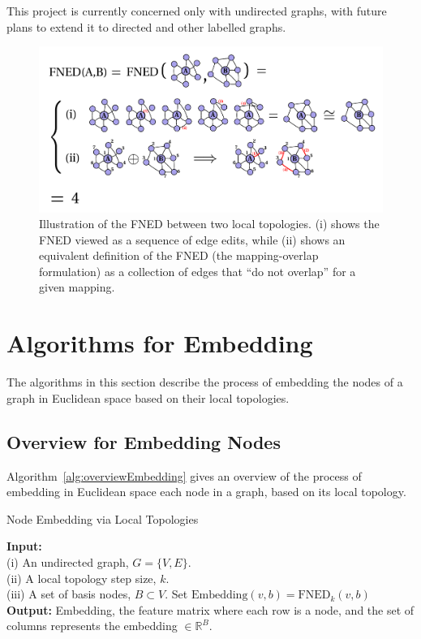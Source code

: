 \documentclass{article}
\begin{document}
This project is currently concerned only with undirected graphs, with future plans to extend it to directed and other labelled graphs. 


\begin{figure}[!]
  \centering               
  \includegraphics[width=1\textwidth]{../img/fnedRelated/fnedFigure.pdf}
  \caption{Illustration of the FNED between two local topologies. (i) shows the FNED viewed as a sequence of edge edits, while (ii) shows an equivalent definition of the FNED (the mapping-overlap formulation) as a collection of edges that ``do not overlap'' for a given mapping.}
  \label{fig:fnedFigure}
\end{figure}




\section{Algorithms for Embedding}
\label{sec:algos}
The algorithms in this section describe the process of embedding the nodes of a graph in Euclidean space based on their local topologies.



\subsection{Overview for Embedding Nodes}

Algorithm~\ref{alg:overviewEmbedding} gives an overview of the process of embedding in Euclidean space each node in a graph, based on its local topology.

\begin{algorithm}[!]
\caption{Node Embedding via Local Topologies}
\label{alg:overviewEmbedding}
\begin{algorithmic}[1]
\STATE \textbf{Input:} \\(i) An undirected graph, $G = \{V,E\}$.\\(ii) A local topology step size, $k$.\\(iii) A set of basis nodes, $B \subset V$.
\STATE Set $\text{Embedding}(v,b) = \text{FNED}_{k}(v,b)$
\ENDFOR
\ENDFOR
\STATE \textbf{Output:} Embedding, the feature matrix where each row is a node, and the set of columns represents the embedding $\in \mathbb{R}^{B}$.
\end{algorithmic}
\end{algorithm}
\end{document}
